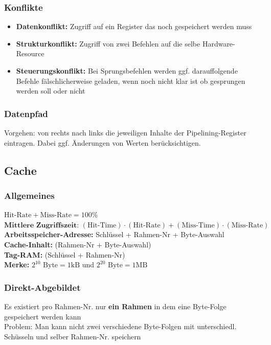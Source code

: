 \documentclass[german, threecolumn, 8pt]{latex4ei/latex4ei_sheet}
\begin{document}
\subsubsection{Konflikte}
\begin{itemize}\itemsep0pt
\item \textbf{Datenkonflikt:} Zugriff auf ein Register das noch gespeichert werden muss
\item \textbf{Strukturkonflikt:} Zugriff von zwei Befehlen auf die selbe Hardware-Resource 
\item \textbf{Steuerungskonflikt:} Bei Sprungsbefehlen werden ggf. darauffolgende Befehle fälschlicherweise geladen, wenn noch nicht klar ist ob gesprungen werden soll oder nicht
\end{itemize}
\subsubsection{Datenpfad}
Vorgehen: von rechts nach links die jeweiligen Inhalte der Pipelining-Register eintragen. Dabei ggf. Änderungen von Werten berücksichtigen.
\begin{minipage}{\columnwidth}
\subsection{Cache}
\subsubsection{Allgemeines}
$\text{Hit-Rate} + \text{Miss-Rate} = 100\%$ \\
$\textbf{Mittlere Zugriffszeit: } (\text{Hit-Time}) \cdot (\text{Hit-Rate}) + (\text{Miss-Time}) \cdot (\text{Miss-Rate})$ \\
\textbf{Arbeitsspeicher-Adresse:} Schlüssel + Rahmen-Nr + Byte-Auswahl \\
\textbf{Cache-Inhalt:} (Rahmen-Nr + Byte-Auswahl)\\
\textbf{Tag-RAM:} (Schlüssel + Rahmen-Nr)\\
\textbf{Merke:} $2^{10} \text{ Byte}= 1 \text{kB}$ und $2^{20} \text{ Byte}=1 \text{MB}$\\
\end{minipage}
\subsubsection{Direkt-Abgebildet}
Es existiert pro Rahmen-Nr. nur \textbf{ein Rahmen} in dem eine Byte-Folge gespeichert werden kann \\
Problem: Man kann nicht zwei verschiedene Byte-Folgen mit unterschiedl. Schüsseln und selber Rahmen-Nr. speichern
\end{document}
